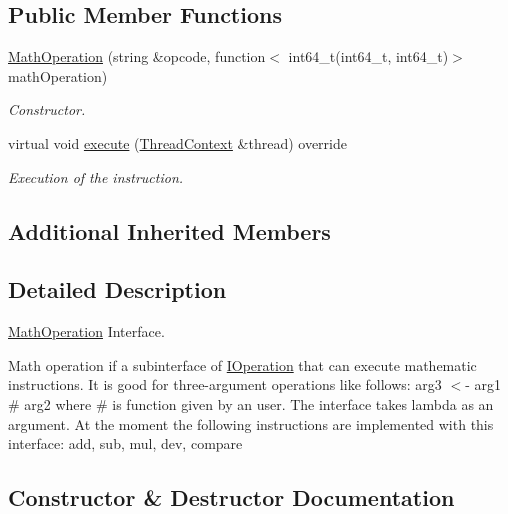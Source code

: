 \subsection*{Public Member Functions}
\begin{DoxyCompactItemize}
\item 
\mbox{\hyperlink{struct_evm_1_1_operation_1_1_math_operation_a039f3663ce4a0b579c19e1d236d81cd5}{Math\+Operation}} (string \&opcode, function$<$ int64\+\_\+t(int64\+\_\+t, int64\+\_\+t)$>$ math\+Operation)
\begin{DoxyCompactList}\small\item\em Constructor. \end{DoxyCompactList}\item 
virtual void \mbox{\hyperlink{struct_evm_1_1_operation_1_1_math_operation_a5ffc66e4ff4e6f59b1cd2512aad54380}{execute}} (\mbox{\hyperlink{struct_evm_1_1_thread_context}{Thread\+Context}} \&thread) override
\begin{DoxyCompactList}\small\item\em Execution of the instruction. \end{DoxyCompactList}\end{DoxyCompactItemize}
\subsection*{Additional Inherited Members}


\subsection{Detailed Description}
\mbox{\hyperlink{struct_evm_1_1_operation_1_1_math_operation}{Math\+Operation}} Interface. 

Math operation if a subinterface of \mbox{\hyperlink{struct_evm_1_1_operation_1_1_i_operation}{I\+Operation}} that can execute mathematic instructions. It is good for three-\/argument operations like follows\+: arg3 $<$-\/ arg1 \# arg2 where \# is function given by an user. The interface takes lambda as an argument. At the moment the following instructions are implemented with this interface\+: add, sub, mul, dev, compare 

\subsection{Constructor \& Destructor Documentation}
\mbox{\label{struct_evm_1_1_operation_1_1_math_operation_a039f3663ce4a0b579c19e1d236d81cd5}} 
